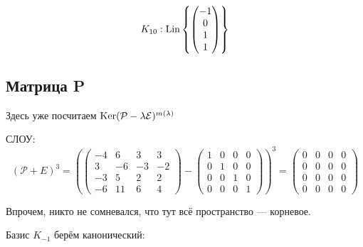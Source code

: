 \documentclass[12pt, a4paper]{article}
\begin{document}
    
    \begin{equation}
        K_{10}: \operatorname{Lin} \left\{\begin{pmatrix} -1\\0\\1\\1 \end{pmatrix} \right\}
    \end{equation}


    \subsection{Матрица P}

    Здесь уже посчитаем $\operatorname{Ker} (\mathcal{P} - \lambda \mathcal{E})^{m(\lambda)}$

    СЛОУ:
    \begin{equation}
        (\mathcal{P} + E)^3 = \left( \left(\begin{matrix}
            -4 & 6 & 3 & 3 \\
            3 & -6 & -3 & -2 \\
            -3 & 5 & 2 & 2 \\
            -6 & 11 & 6 & 4
        \end{matrix}\right) - \left(\begin{matrix}
            1 & 0 & 0 & 0 \\
            0 & 1 & 0 & 0 \\
            0 & 0 & 1 & 0 \\
            0 & 0 & 0 & 1
        \end{matrix}\right) \right)^3 = \left(\begin{matrix}
            0 & 0 & 0 & 0 \\
            0 & 0 & 0 & 0 \\
            0 & 0 & 0 & 0 \\
            0 & 0 & 0 & 0
        \end{matrix}\right)
    \end{equation}

    Впрочем, никто не сомневался, что тут всё пространство — корневое.

    Базис $K_{-1}$ берём канонический:
\end{document}
